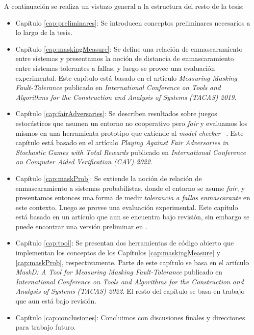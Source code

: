 A continuación se realiza un vistazo general a la estructura del resto de la tesis:
\begin{itemize}
	
\item Capítulo \ref{cap:preliminares}: Se introducen conceptos preliminares necesarios a lo largo de la tesis.
\item Capítulo \ref{cap:maskingMeasure}: Se define una relación de enmascaramiento entre sistemas y presentamos la noción de distancia de enmascaramiento entre sistemas tolerantes a fallas, y luego se provee una evaluación experimental. Este capítulo está basado en el artículo \textit{Measuring Masking Fault-Tolerance}\cite{CastroDDP18b} publicado en \textit{International Conference on Tools and Algorithms for the Construction and Analysis of Systems (TACAS) 2019}.
\item Capítulo \ref{cap:fairAdversaries}: Se describen resultados sobre juegos estocásticos que asumen un entorno no cooperativo pero \textit{fair} y evaluamos los mismos en una herramienta prototipo que extiende al \textit{model checker} {\Prism}~\cite{DBLP:conf/cav/KwiatkowskaN0S20,DBLP:conf/cav/KwiatkowskaNP11}. Este capítulo está basado en el artículo \textit{Playing Against Fair Adversaries in Stochastic Games with Total Rewards}\cite{CastroDDP22} publicado en \textit{International Conference on Computer Aided Verification (CAV) 2022}.
\item Capítulo \ref{cap:maskProb}: Se extiende la noción de relación de enmascaramiento a sistemas probabilistas, donde el entorno se asume \textit{fair}, y presentamos entonces una forma de medir \textit{tolerancia a fallas enmascarante} en este contexto. Luego se provee una evaluación experimental. Este capítulo está basado en un artículo que aun se encuentra bajo revisión, sin embargo se puede encontrar una versión preliminar en \cite{DBLP:journals/corr/abs-2207-02045}.
\item Capítulo \ref{cap:tool}: Se presentan dos herramientas de código abierto que implementan los conceptos de los Capítulos \ref{cap:maskingMeasure} y \ref{cap:maskProb}, respectivamente. Parte de este capítulo se basa en el artículo \textit{MaskD: A Tool for Measuring Masking Fault-Tolerance}\cite{PutrueleDCD22} publicado en \textit{International Conference on Tools and Algorithms for the Construction and Analysis of Systems (TACAS) 2022}. El resto del capítulo se basa en trabajo que aun está bajo revisión.
\item Capítulo \ref{cap:conclusiones}: Concluimos con discusiones finales y direcciones para trabajo futuro.
\end{itemize}
